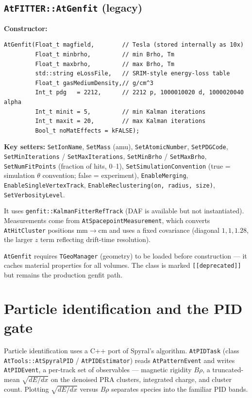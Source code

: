 \documentclass[11pt,a4paper]{article}
\newcommand{\code}[1]{\texttt{\small #1}}
\begin{document}
\subsection{\texttt{AtFITTER::AtGenfit} (legacy)}

\textbf{Constructor:}
\begin{lstlisting}
AtGenfit(Float_t magfield,        // Tesla (stored internally as 10x)
         Float_t minbrho,         // min Brho, Tm
         Float_t maxbrho,         // max Brho, Tm
         std::string eLossFile,   // SRIM-style energy-loss table
         Float_t gasMediumDensity,// g/cm^3
         Int_t pdg   = 2212,      // 2212 p, 1000010020 d, 1000020040 alpha
         Int_t minit = 5,         // min Kalman iterations
         Int_t maxit = 20,        // max Kalman iterations
         Bool_t noMatEffects = kFALSE);
\end{lstlisting}

\textbf{Key setters:} \code{SetIonName}, \code{SetMass} (amu),
\code{SetAtomicNumber}, \code{SetPDGCode}, \code{SetMinIterations} /
\code{SetMaxIterations}, \code{SetMinBrho} / \code{SetMaxBrho},
\code{SetNumFitPoints} (fraction of hits, 0--1), \code{SetSimulationConvention}
(true = simulation $\theta$ convention; false = experiment), \code{EnableMerging},
\code{EnableSingleVertexTrack}, \code{EnableReclustering(on, radius, size)},
\code{SetVerbosityLevel}.

It uses \code{genfit::KalmanFitterRefTrack} (DAF is available but not
instantiated). Measurements come from \code{AtSpacepointMeasurement}, which
converts \code{AtHitCluster} positions mm$\rightarrow$cm and uses a fixed
covariance (diagonal $1,1,1.28$, the larger $z$ term reflecting drift-time
resolution).

\begin{warnbox}
\code{AtGenfit} requires \code{TGeoManager} (geometry) to be loaded before
construction --- it caches material properties for all volumes. The class is
marked \code{[[deprecated]]} but remains the production genfit path.
\end{warnbox}

\section{Particle identification and the PID gate}\label{sec:pidgate}

Particle identification uses a C++ port of Spyral's algorithm. \code{AtPIDTask}
(class \code{AtTools::AtSpyralPID} / \code{AtPIDEstimator}) reads
\code{AtPatternEvent} and writes \code{AtPIDEvent}, a per-track set of observables
--- magnetic rigidity $B\rho$, a truncated-mean $\sqrt{dE/dx}$ on the denoised PRA
clusters, integrated charge, and cluster count. Plotting $\sqrt{dE/dx}$ versus
$B\rho$ separates species into the familiar PID bands.
\end{document}
